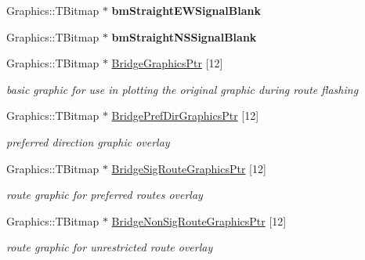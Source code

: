 \begin{DoxyCompactItemize}
Graphics\+::\+T\+Bitmap $\ast$ {\bfseries bm\+Straight\+E\+W\+Signal\+Blank}
\item 
\mbox{\label{class_t_rail_graphics_a63c9ae8dc09e75ce1e7fcbee848cabc0}} 
Graphics\+::\+T\+Bitmap $\ast$ {\bfseries bm\+Straight\+N\+S\+Signal\+Blank}
\item 
\mbox{\label{class_t_rail_graphics_abe7c485ea70f0f6cf89b0fd7559826fe}} 
Graphics\+::\+T\+Bitmap $\ast$ \mbox{\hyperlink{class_t_rail_graphics_abe7c485ea70f0f6cf89b0fd7559826fe}{Bridge\+Graphics\+Ptr}} \mbox{[}12\mbox{]}
\begin{DoxyCompactList}\small\item\em basic graphic for use in plotting the original graphic during route flashing \end{DoxyCompactList}\item 
\mbox{\label{class_t_rail_graphics_a0ff7000b585b83206e1fa91f1e026d9e}} 
Graphics\+::\+T\+Bitmap $\ast$ \mbox{\hyperlink{class_t_rail_graphics_a0ff7000b585b83206e1fa91f1e026d9e}{Bridge\+Pref\+Dir\+Graphics\+Ptr}} \mbox{[}12\mbox{]}
\begin{DoxyCompactList}\small\item\em preferred direction graphic overlay \end{DoxyCompactList}\item 
\mbox{\label{class_t_rail_graphics_a029f04249337f7d891f83f3e713f81cc}} 
Graphics\+::\+T\+Bitmap $\ast$ \mbox{\hyperlink{class_t_rail_graphics_a029f04249337f7d891f83f3e713f81cc}{Bridge\+Sig\+Route\+Graphics\+Ptr}} \mbox{[}12\mbox{]}
\begin{DoxyCompactList}\small\item\em route graphic for preferred routes overlay \end{DoxyCompactList}\item 
\mbox{\label{class_t_rail_graphics_aea54a768466dceec28407b8ea1def372}} 
Graphics\+::\+T\+Bitmap $\ast$ \mbox{\hyperlink{class_t_rail_graphics_aea54a768466dceec28407b8ea1def372}{Bridge\+Non\+Sig\+Route\+Graphics\+Ptr}} \mbox{[}12\mbox{]}
\begin{DoxyCompactList}\small\item\em route graphic for unrestricted route overlay \end{DoxyCompactList}\item 

\end{DoxyCompactItemize}
